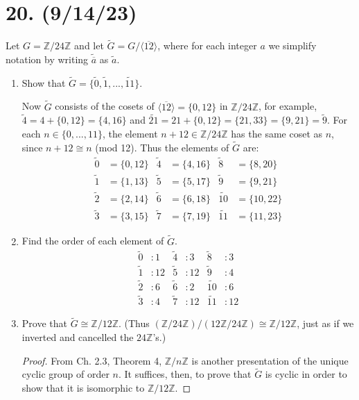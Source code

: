 \documentclass{article}
\begin{document}
\section*{20. (9/14/23)}

Let $G = \mathbb{Z}/24\mathbb{Z}$ and let $\widetilde{G} = G/\langle \overline{12} \rangle$, where for each integer $a$ we simplify notation by writing $\widetilde{\overline{a}}$ as $\widetilde{a}$.

\begin{enumerate}[label=(\alph*), itemsep=0em]
    \item Show that $\widetilde{G} = \{ \widetilde{0}, \widetilde{1}, ..., \widetilde{11} \}$.

          Now $\widetilde{G}$ consists of the cosets of $\langle \overline{12} \rangle = \{ 0, 12 \}$ in $\mathbb{Z}/24\mathbb{Z}$, for example, $\widetilde{4} = 4 + \{ 0, 12 \} = \{ 4, 16 \}$ and $\widetilde{21} = 21 + \{ 0, 12 \} = \{ 21, 33 \} = \{ 9, 21 \} = \widetilde{9}$. For each $n \in \{ 0, ..., 11 \}$, the element $n + 12 \in \mathbb{Z}/24\mathbb{Z}$ has the same coset as $n$, since $n + 12 \cong n$ (mod 12). Thus the elements of $\widetilde{G}$ are:
          \begin{align*}
            \widetilde{0} &= \{ 0, 12 \} & \widetilde{4} &= \{ 4, 16 \} & \widetilde{8} &= \{ 8, 20 \} \\
            \widetilde{1} &= \{ 1, 13 \} & \widetilde{5} &= \{ 5, 17 \} & \widetilde{9} &= \{ 9, 21 \} \\
            \widetilde{2} &= \{ 2, 14 \} & \widetilde{6} &= \{ 6, 18 \} & \widetilde{10} &= \{ 10, 22 \} \\
            \widetilde{3} &= \{ 3, 15 \} & \widetilde{7} &= \{ 7, 19 \} & \widetilde{11} &= \{ 11, 23 \}
          \end{align*}
    \item Find the order of each element of $\widetilde{G}$.
          \begin{align*}
            \widetilde{0} &: 1 & \widetilde{4} &: 3 & \widetilde{8} &: 3 \\
            \widetilde{1} &: 12 & \widetilde{5} &: 12 & \widetilde{9} &: 4 \\
            \widetilde{2} &: 6 & \widetilde{6} &: 2 & \widetilde{10} &: 6 \\
            \widetilde{3} &: 4 & \widetilde{7} &: 12 & \widetilde{11} &: 12
          \end{align*}
    \item Prove that $\widetilde{G} \cong \mathbb{Z}/12\mathbb{Z}$. (Thus $(\mathbb{Z}/24\mathbb{Z}) / (12\mathbb{Z}/24\mathbb{Z}) \cong \mathbb{Z}/12\mathbb{Z}$, just as if we inverted and cancelled the $24\mathbb{Z}$'s.)
          \begin{proof}
            From Ch. 2.3, Theorem 4, $\mathbb{Z}/n\mathbb{Z}$ is another presentation of the unique cyclic group of order $n$. It suffices, then, to prove that $\widetilde{G}$ is cyclic in order to show that it is isomorphic to $\mathbb{Z}/12\mathbb{Z}$.


\end{proof}
\end{enumerate}
\end{document}
